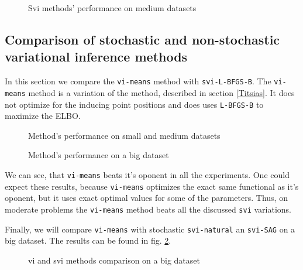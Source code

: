 		\begin{figure}[h!]
			\centering
			\subfloat{
				\scalebox{0.75}{
					
				}
			}
			\subfloat{
				\scalebox{0.75}{
		    		
				}
			}
			\label{svi_medium}
			\caption{Svi methods' performance on medium datasets}
		\end{figure}

\subsection{Comparison of stochastic and non-stochastic variational inference methods}
	In this section we compare the \lstinline{vi-means} method with \lstinline{svi-L-BFGS-B}. The \lstinline{vi-means} method is a variation of the method, described in section \ref{Titsias}. It does not optimize for the inducing point positions and does uses \lstinline{L-BFGS-B} to maximize the ELBO.

	\begin{figure}[!h]
		\centering
		\subfloat{
			\scalebox{0.75}{
				
			}
		}
		\subfloat{
			\scalebox{0.75}{
	    		
			}
		}
		
		\caption{Method's performance on small and medium datasets}
	\end{figure}

	\begin{figure}[!h]
		\centering
		\subfloat{
			\scalebox{0.75}{
		    	
			}
		}
		\caption{Method's performance on a big dataset}
	\end{figure}

	We can see, that \lstinline{vi-means} beats it's oponent in all the experiments. One could expect these results, because \lstinline{vi-means} optimizes the exact same functional as it's oponent, but it uses exact optimal values for some of the parameters. Thus, on moderate problems the \lstinline{vi-means} method beats all the discussed \lstinline{svi} variations.

	Finally, we will compare \lstinline{vi-means} with stochastic \lstinline{svi-natural} an \lstinline{svi-SAG} on a big dataset. The results can be found in fig. \ref{visvi_big}.

	\begin{figure}[!h]
		\centering
		\subfloat{
			\scalebox{0.73}{
				
			}
		}
		\caption{vi and svi methods comparison on a big dataset}
		\label{visvi_big}
	\end{figure}

